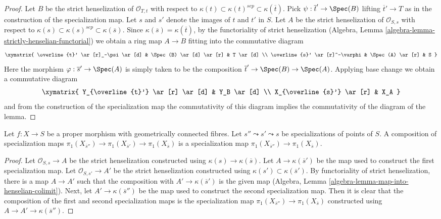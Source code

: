 \begin{proof}
Let $B$ be the strict henselization of $\mathcal{O}_{T, t}$ with respect to
$\kappa(t) \subset \kappa(t)^{sep} \subset \kappa(\overline{t})$.
Pick $\psi : \overline{t}' \to \Spec(B)$ lifting $\overline{t}' \to T$
as in the construction of the specialization map.
Let $s$ and $s'$ denote the images of $t$ and $t'$ in $S$.
Let $A$ be the strict henselization of $\mathcal{O}_{S, s}$
with respect to
$\kappa(s) \subset \kappa(s)^{sep} \subset \kappa(\overline{s})$.
Since $\kappa(\overline{s}) = \kappa(\overline{t})$,
by the functoriality of strict henselization
(Algebra, Lemma \ref{algebra-lemma-strictly-henselian-functorial})
we obtain a ring map $A \to B$ fitting into the commutative diagram
$$
\xymatrix{
\overline{t}' \ar[r]_-\psi \ar[d] & \Spec(B) \ar[d] \ar[r] & T \ar[d] \\
\overline{s}' \ar[r]^-\varphi & \Spec(A) \ar[r] & S
}
$$
Here the morphism $\varphi : \overline{s}' \to \Spec(A)$ is simply taken
to be the composition $\overline{t}' \to \Spec(B) \to \Spec(A)$.
Applying base change we obtain a commutative diagram
$$
\xymatrix{
Y_{\overline{t}'} \ar[r] \ar[d] & Y_B \ar[d] \\
X_{\overline{s}'} \ar[r] & X_A
}
$$
and from the construction of the specialization map the commutativity
of this diagram implies the commutativity of the diagram of the lemma.
\end{proof}

\begin{lemma}
\label{lemma-specialization-map-composition}
Let $f : X \to S$ be a proper morphism with geometrically connected fibres.
Let $s'' \leadsto s' \leadsto s$ be specializations of points of $S$.
A composition of specialization maps
$\pi_1(X_{\overline{s}''}) \to \pi_1(X_{\overline{s}'}) \to
\pi_1(X_{\overline{s}})$ is a specialization map
$\pi_1(X_{\overline{s}''}) \to \pi_1(X_{\overline{s}})$.
\end{lemma}

\begin{proof}
Let $\mathcal{O}_{S, s} \to A$ be the strict henselization
constructed using $\kappa(s) \to \kappa(\overline{s})$.
Let $A \to \kappa(\overline{s}')$ be the map used to construct
the first specialization map. Let $\mathcal{O}_{S, s'} \to A'$
be the strict henselization constructed using
$\kappa(s') \subset \kappa(\overline{s}')$.
By functoriality of strict henselization, there is a map
$A \to A'$ such that the composition with $A' \to \kappa(\overline{s}')$
is the given map
(Algebra, Lemma \ref{algebra-lemma-map-into-henselian-colimit}).
Next, let $A' \to \kappa(\overline{s}'')$ be the map used to
construct the second specialization map. Then it is clear that
the composition of the first and second specialization maps
is the specialization map
$\pi_1(X_{\overline{s}''}) \to \pi_1(X_{\overline{s}})$
constructed using $A \to A' \to \kappa(\overline{s}'')$.
\end{proof}

